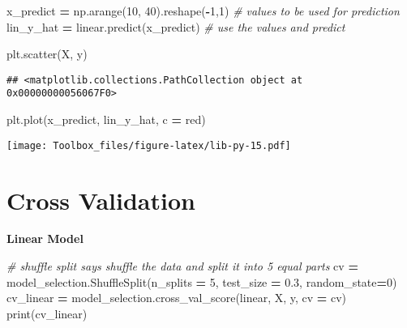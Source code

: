 \documentclass[
]{book}
\newenvironment{Shaded}{\begin{snugshade}}{\end{snugshade}}
\newcommand{\BuiltInTok}[1]{#1}
\newcommand{\CommentTok}[1]{\textcolor[rgb]{0.56,0.35,0.01}{\textit{#1}}}
\newcommand{\DecValTok}[1]{\textcolor[rgb]{0.00,0.00,0.81}{#1}}
\newcommand{\FloatTok}[1]{\textcolor[rgb]{0.00,0.00,0.81}{#1}}
\newcommand{\NormalTok}[1]{#1}
\newcommand{\OperatorTok}[1]{\textcolor[rgb]{0.81,0.36,0.00}{\textbf{#1}}}
\newcommand{\StringTok}[1]{\textcolor[rgb]{0.31,0.60,0.02}{#1}}
\begin{document}
\begin{Shaded}
\begin{Highlighting}[]
\NormalTok{x\_predict }\OperatorTok{=}\NormalTok{ np.arange(}\DecValTok{10}\NormalTok{, }\DecValTok{40}\NormalTok{).reshape(}\OperatorTok{{-}}\DecValTok{1}\NormalTok{,}\DecValTok{1}\NormalTok{) }\CommentTok{\# values to be used for prediction}
\NormalTok{lin\_y\_hat }\OperatorTok{=}\NormalTok{ linear.predict(x\_predict) }\CommentTok{\# use the values and predict}
\end{Highlighting}
\end{Shaded}

\begin{Shaded}
\begin{Highlighting}[]
\NormalTok{plt.scatter(X, y)}
\end{Highlighting}
\end{Shaded}

\begin{verbatim}
## <matplotlib.collections.PathCollection object at 0x00000000056067F0>
\end{verbatim}

\begin{Shaded}
\begin{Highlighting}[]
\NormalTok{plt.plot(x\_predict, lin\_y\_hat, c }\OperatorTok{=} \StringTok{\textquotesingle{}red\textquotesingle{}}\NormalTok{)}
\end{Highlighting}
\end{Shaded}

\texttt{[image: Toolbox\_files/figure-latex/lib-py-15.pdf]}

\hypertarget{cross-validation}{%
\section{Cross Validation}\label{cross-validation}}

\textbf{Linear Model}

\begin{Shaded}
\begin{Highlighting}[]
\CommentTok{\# shuffle split says \textquotesingle{}shuffle the data\textquotesingle{} and split it into 5 equal parts}
\NormalTok{cv }\OperatorTok{=}\NormalTok{ model\_selection.ShuffleSplit(n\_splits }\OperatorTok{=} \DecValTok{5}\NormalTok{, test\_size }\OperatorTok{=} \FloatTok{0.3}\NormalTok{, random\_state}\OperatorTok{=}\DecValTok{0}\NormalTok{)}
\NormalTok{cv\_linear }\OperatorTok{=}\NormalTok{ model\_selection.cross\_val\_score(linear, X, y, cv }\OperatorTok{=}\NormalTok{ cv)}
\BuiltInTok{print}\NormalTok{(cv\_linear)}
\end{Highlighting}
\end{Shaded}
\end{document}
